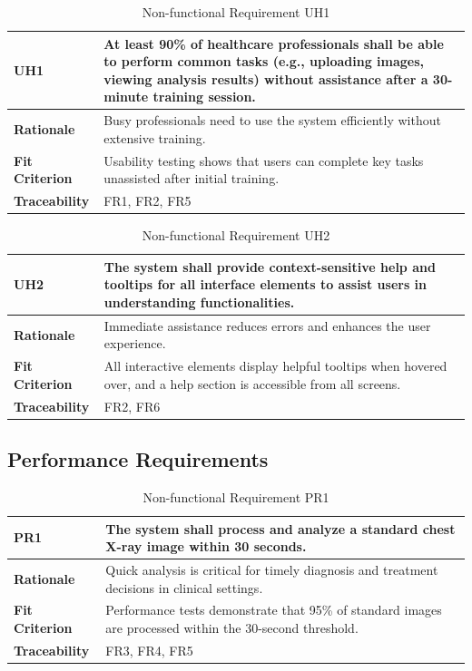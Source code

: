 \documentclass[12pt]{article}
\begin{document}
\begin{table}[h!]
\centering
{}
\begin{tabular}{|p{3.5cm}|p{11.5cm}|}
\hline
\rowcolor{gray!30}
\textbf{UH1} & At least 90\% of healthcare professionals shall be able to perform common tasks (e.g., uploading images, viewing analysis results) without assistance after a 30-minute training session. \\
\hline
\textbf{Rationale} & Busy professionals need to use the system efficiently without extensive training. \\
\hline
\textbf{Fit Criterion} & Usability testing shows that users can complete key tasks unassisted after initial training. \\
\hline
\textbf{Traceability} & FR1, FR2, FR5 \\
\hline
\end{tabular}
\caption{Non-functional Requirement UH1}
\end{table}

\begin{table}[h!]
\centering
{}
\begin{tabular}{|p{3.5cm}|p{11.5cm}|}
\hline
\rowcolor{gray!30}
\textbf{UH2} & The system shall provide context-sensitive help and tooltips for all interface elements to assist users in understanding functionalities. \\
\hline
\textbf{Rationale} & Immediate assistance reduces errors and enhances the user experience. \\
\hline
\textbf{Fit Criterion} & All interactive elements display helpful tooltips when hovered over, and a help section is accessible from all screens. \\
\hline
\textbf{Traceability} & FR2, FR6 \\
\hline
\end{tabular}
\caption{Non-functional Requirement UH2}
\end{table}
\clearpage
\subsection{Performance Requirements}

\begin{table}[h!]
\centering
{}
\begin{tabular}{|p{3.5cm}|p{11.5cm}|}
\hline
\rowcolor{gray!30}
\textbf{PR1} & The system shall process and analyze a standard chest X-ray image within 30 seconds. \\
\hline
\textbf{Rationale} & Quick analysis is critical for timely diagnosis and treatment decisions in clinical settings. \\
\hline
\textbf{Fit Criterion} & Performance tests demonstrate that 95\% of standard images are processed within the 30-second threshold. \\
\hline
\textbf{Traceability} & FR3, FR4, FR5 \\
\hline
\end{tabular}
\caption{Non-functional Requirement PR1}
\end{table}
\end{document}

